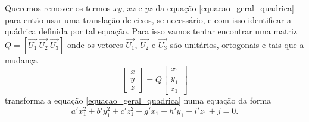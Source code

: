 Queremos remover os termos $xy$, $xz$ e $yz$ da equação \eqref{equacao_geral_quadrica} para então usar uma translação de eixos, se necessário, e com isso identificar a quádrica definida por tal equação. Para isso vamos tentar encontrar uma matriz $Q = [\vec{U_1}\ \vec{U_2}\ \vec{U_3}]$ onde os vetores $\vec{U_1}$, $\vec{U_2}$ e $\vec{U_3}$ são unitários, ortogonais e tais que a mudança
\begin{equation}\label{substituicao_quadrica}
    \begin{bmatrix}
        x \\
        y \\
        z
    \end{bmatrix} = Q \begin{bmatrix}
        x_1 \\
        y_1 \\
        z_1
    \end{bmatrix}
\end{equation}
transforma a equação \eqref{equacao_geral_quadrica} numa equação da forma
\begin{equation}\label{equacao_rotacionada_quadrica}
    a'x_1^2 + b'y_1^2 + c'z_1^2 + g'x_1 + h'y_1 + i'z_1 + j = 0.
\end{equation}

